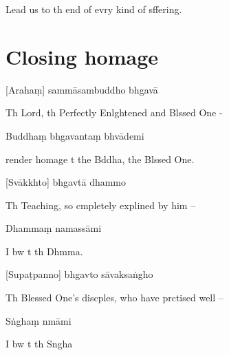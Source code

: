 \begin{english}
  Lead us to th end of evry kind of sffering.
\end{english}

\chapter[Closing homage]{Closing homage}

[Arahaṃ] sammāsambuddho bhgavā

\begin{english}
  Th Lord, th Perfectly Enlghtened and Blssed One -
\end{english}

Buddhaṃ bhgavantaṃ bhvādemi

\begin{english}
   render homage t the Bddha, the Blssed One.
\end{english}

[Svākkhto] bhgavtā dhammo

\begin{english}
  Th Teaching, so cmpletely explined by him --
\end{english}

Dhammaṃ namassāmi

\begin{english}
  I bw t th Dhmma.
\end{english}


[Supaṭpanno] bhgavto sāvaksaṅgho

\begin{english}
  Th Blessed One's discples, who have prctised well --
\end{english}

Sṅghaṃ nmāmi

\begin{english}
  I bw t th Sngha
\end{english}

